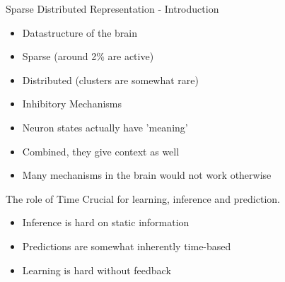 \begin{frame}[c]{Sparse Distributed Representation - Introduction}
    \Large
    \begin{itemize}[<+(1)->]
        \item Datastructure of the brain
        \item Sparse (around 2\% are active)
        \item Distributed (clusters are somewhat rare)
        \item Inhibitory Mechanisms
        \item Neuron states actually have 'meaning'
        \item Combined, they give context as well
        \item Many mechanisms in the brain would not work otherwise
    \end{itemize}
\end{frame}





\begin{frame}[c]{The role of Time}
    \Large
    Crucial for learning, inference and prediction.
    \begin{itemize}[<+(1)->]
        \item Inference is hard on static information
        \item Predictions are somewhat inherently time-based
        \item Learning is hard without feedback
    \end{itemize}
\end{frame}


